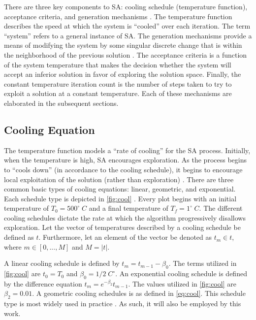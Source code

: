 \documentclass[ee,thesis]{usuthesis}
\newcommand{\Tau}{T}                        %
\begin{document}
There are three key components to SA: cooling schedule (temperature function), acceptance criteria, and generation
mechanisms \cite{keller-2019-multi-objec,press-1992-numer-recip}. The temperature function describes the speed at
which the system is ``cooled'' over each iteration. The term ``system'' refers to a general instance of SA. The generation
mechanisms provide a means of modifying the system by some singular discrete change that is within the neighborhood of
the previous solution \cite{gendreau-2018-handb-metah}. The acceptance criteria is a function of the system temperature
that makes the decision whether the system will accept an inferior solution in favor of exploring the solution space.
Finally, the constant temperature iteration count is the number of steps taken to try to exploit a solution at a
constant temperature. Each of these mechanisms are elaborated in the subsequent sections.

\subsection{Cooling Equation}
\label{cooling-equation-experimental}
The temperature function models a ``rate of cooling'' for the SA process. Initially, when the temperature is high, SA
encourages exploration. As the process begins to ``cools down'' (in accordance to the cooling schedule), it begins to
encourage local exploitation of the solution (rather than exploration)
\cite{rutenbar-1989-simul-anneal-algor,henderson-1989-theor-pract}. There are three common basic types of cooling
equations: linear, geometric, and exponential. Each schedule type is depicted in \ref{fig:cool}
\cite{keller-2019-multi-objec}. Every plot begins with an initial temperature of \(T_0 = 500^\circ\; C\) and a final
temperature of \(T_f = 1^\circ\; C\). The different cooling schedules dictate the rate at which the algorithm progressively
disallows exploration. Let the vector of temperatures described by a cooling schedule be defined as \(t\). Furthermore,
let an element of the vector be denoted as \(t_m \in t\), where \(m \in [0,...,M]\) and \(M = \lvert t \rvert\).

A linear cooling schedule is defined by \(t_m = t_{m-1} - \beta_0\). The terms utilized in \ref{fig:cool} are \(t_0 = \Tau_0\)
and \(\beta_0 = 1/2\; C^\circ\). An exponential cooling schedule is defined by the difference equation \(t_m = e^{-\beta_2}t_{m-1}\).
The values utilized in \ref{fig:cool} are \(\beta_2 = 0.01\). A geometric cooling schedules is as defined in \ref{eq:cool}. This
schedule type is most widely used in practice \cite{keller-2019-multi-objec}. As such, it will also be employed by this
work.
\end{document}
